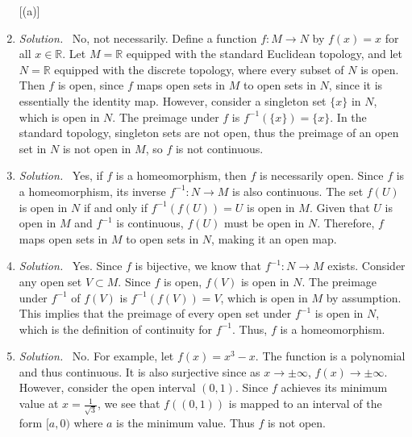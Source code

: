 \documentclass[12pt]{article}
\newcommand{\bbR}{\mathbb{R}}
\renewcommand{\_}[1]{\underline{ #1 }}
\theoremstyle{definition}
\newenvironment{exercise}[1]
  {\renewcommand\theinnercustomthm{#1}\innercustomthm}
  {\endinnercustomthm}
\newenvironment{solution}{\par\noindent\textit{Solution.}\ }{\par}
\numberwithin{equation}{subsection}
\begin{document}
\begin{exercise}{28}
    \begin{enumerate} [(a)]
        \item \begin{solution}
            No, not necessarily. Define a function $f: M \to N$ by $f(x) = x$ for all $x \in \bbR$. Let $M = \bbR$ equipped with the standard Euclidean topology, and let $N = \bbR$ equipped with the discrete topology, where every subset of $N$ is open. Then $f$ is open, since $f$ maps open sets in $M$ to open sets in $N$, since it is essentially the identity map. However, consider a singleton set $\{ x \}$ in $N$, which is open in $N$. The preimage under $f$ is $f^{-1}(\{ x \}) = \{ x \}$. In the standard topology, singleton sets are not open, thus the preimage of an open set in $N$ is not open in $M$, so $f$ is not continuous. 
        \end{solution}
        \item \begin{solution}
            Yes, if $f$ is a homeomorphism, then $f$ is necessarily open. Since $f$ is a homeomorphism, its inverse $f^{-1}: N \to M$ is also continuous. The set $f(U)$ is open in $N$ if and only if $f^{-1}(f(U)) = U$ is open in $M$. Given that $U$ is open in $M$ and $f^{-1}$ is continuous, $f(U)$ must be open in $N$. Therefore, $f$ maps open sets in $M$ to open sets in $N$, making it an open map. 
        \end{solution}
        \item \begin{solution}
            Yes. Since $f$ is bijective, we know that $f^{-1}: N \to M$ exists. Consider any open set $V \subset M$. Since $f$ is open, $f(V)$ is open in $N$. The preimage under $f^{-1}$ of $f(V)$ is $f^{-1}(f(V)) = V$, which is open in $M$ by assumption. This implies that the preimage of every open set under $f^{-1}$ is open in $N$, which is the definition of continuity for $f^{-1}$. Thus, $f$ is a homeomorphism. 
        \end{solution}
        \item \begin{solution}
            No. For example, let $f(x) = x^3 - x$. The function is a polynomial and thus continuous. It is also surjective since as $x \to \pm \infty$, $f(x) \to \pm \infty$. However, consider the open interval $(0, 1)$. Since $f$ achieves its minimum value at $x = \frac{1}{\sqrt{3}}$, we see that $f((0, 1))$ is mapped to an interval of the form $[a, 0)$ where $a$ is the minimum value. Thus $f$ is not open.  

\end{solution}
\end{enumerate}
\end{exercise}
\end{document}
